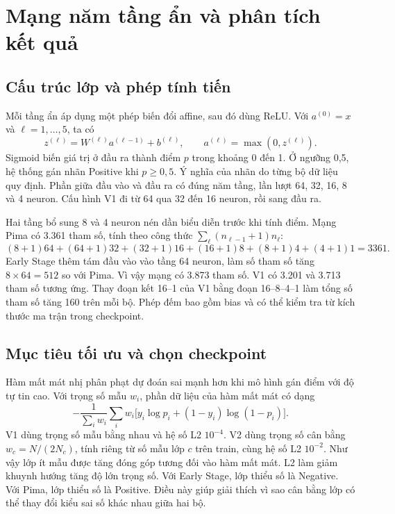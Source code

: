 
\chapter{Mạng năm tầng ẩn và phân tích kết quả}\label{ch:v2-mlp}

\section{Cấu trúc lớp và phép tính tiến}
Mỗi tầng ẩn áp dụng một phép biến đổi affine, sau đó dùng ReLU. Với \(a^{(0)}=x\) và \(\ell=1,\ldots,5\), ta có
\[
    z^{(\ell)}=W^{(\ell)}a^{(\ell-1)}+b^{(\ell)},\qquad
    a^{(\ell)}=\max(0,z^{(\ell)}).
\]
Sigmoid biến giá trị ở đầu ra thành điểm \(p\) trong khoảng 0 đến 1. Ở ngưỡng 0,5, hệ thống gán nhãn Positive khi \(p\geq0{,}5\). Ý nghĩa của nhãn do từng bộ dữ liệu quy định. Phần giữa đầu vào và đầu ra có đúng năm tầng, lần lượt 64, 32, 16, 8 và 4 neuron. Cấu hình V1 đi từ 64 qua 32 đến 16 neuron, rồi sang đầu ra.


Hai tầng bổ sung 8 và 4 neuron nén dần biểu diễn trước khi tính điểm. Mạng Pima có 3.361 tham số, tính theo công thức \(\sum_\ell(n_{\ell-1}+1)n_\ell\):
\[
  (8+1)64+(64+1)32+(32+1)16+(16+1)8+(8+1)4+(4+1)1=3361.
\]
Early Stage thêm tám đầu vào vào tầng 64 neuron, làm số tham số tăng \(8\times64=512\) so với Pima. Vì vậy mạng có 3.873 tham số. V1 có 3.201 và 3.713 tham số tương ứng. Thay đoạn kết 16--1 của V1 bằng đoạn 16--8--4--1 làm tổng số tham số tăng 160 trên mỗi bộ. Phép đếm bao gồm bias và có thể kiểm tra từ kích thước ma trận trong checkpoint.

\section{Mục tiêu tối ưu và chọn checkpoint}
Hàm mất mát nhị phân phạt dự đoán sai mạnh hơn khi mô hình gán điểm với độ tự tin cao. Với trọng số mẫu \(w_i\), phần dữ liệu của hàm mất mát có dạng
\[
 -\frac{1}{\sum_i w_i}\sum_i w_i
 \big[y_i\log p_i+(1-y_i)\log(1-p_i)\big].
\]
V1 dùng trọng số mẫu bằng nhau và hệ số L2 \(10^{-4}\). V2 dùng trọng số cân bằng \(w_c=N/(2N_c)\), tính riêng từ số mẫu lớp \(c\) trên train, cùng hệ số L2 \(10^{-2}\). Như vậy lớp ít mẫu được tăng đóng góp tương đối vào hàm mất mát. L2 làm giảm khuynh hướng tăng độ lớn trọng số. Với Early Stage, lớp thiểu số là Negative. Với Pima, lớp thiểu số là Positive. Điều này giúp giải thích vì sao cân bằng lớp có thể thay đổi kiểu sai số khác nhau giữa hai bộ.

